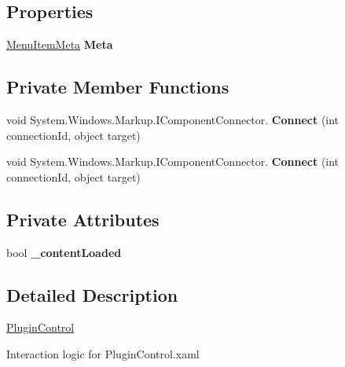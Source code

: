 \subsection*{Properties}
\begin{DoxyCompactItemize}
\item 
\mbox{\hyperlink{class_wpf_handler_1_1_plugins_1_1_menu_item_meta}{Menu\+Item\+Meta}} {\bfseries Meta}
\end{DoxyCompactItemize}
\subsection*{Private Member Functions}
\begin{DoxyCompactItemize}
\item 
\mbox{\label{class_example_plugin2_1_1_plugin_control_aa72f91a86c3337d5c440c7f2820bae36}} 
void System.\+Windows.\+Markup.\+I\+Component\+Connector. {\bfseries Connect} (int connection\+Id, object target)
\item 
\mbox{\label{class_example_plugin2_1_1_plugin_control_aa72f91a86c3337d5c440c7f2820bae36}} 
void System.\+Windows.\+Markup.\+I\+Component\+Connector. {\bfseries Connect} (int connection\+Id, object target)
\end{DoxyCompactItemize}
\subsection*{Private Attributes}
\begin{DoxyCompactItemize}
\item 
\mbox{\label{class_example_plugin2_1_1_plugin_control_a1c084e3b7df83482d6bb1c667fd8a70e}} 
bool {\bfseries \+\_\+content\+Loaded}
\end{DoxyCompactItemize}


\subsection{Detailed Description}
\mbox{\hyperlink{class_example_plugin2_1_1_plugin_control}{Plugin\+Control}} 

Interaction logic for Plugin\+Control.\+xaml 

